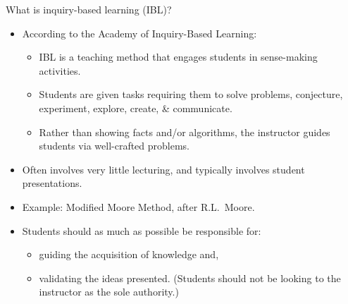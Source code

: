 \documentclass[10pt,handout]{beamer}
\begin{document}
\begin{frame}

\begin{block}{What is inquiry-based learning (IBL)?}
\begin{itemize}
\item<2-> According to the \alert{Academy of Inquiry-Based Learning}:
\begin{itemize}\normalsize
\item<2-> IBL is a teaching method that engages students in sense-making activities.
\item Students are given tasks requiring them to solve problems, conjecture, experiment, explore, create, \& communicate.
\item<2-> Rather than showing facts and/or algorithms, the instructor guides students via well-crafted problems. \pause
\end{itemize}
\item<3-> Often involves very little lecturing, and typically involves student presentations.\pause
\item<4-> Example: Modified Moore Method, after R.L.~Moore. \pause
\item<5-> Students should as much as possible be responsible for:
\begin{itemize}\normalsize
\item<6-> guiding the acquisition of knowledge and,
\item<6-> validating the ideas presented. (Students should not be looking to the instructor as the sole authority.)
\end{itemize}
\end{itemize}
\end{block}

\end{frame}

\end{document}
